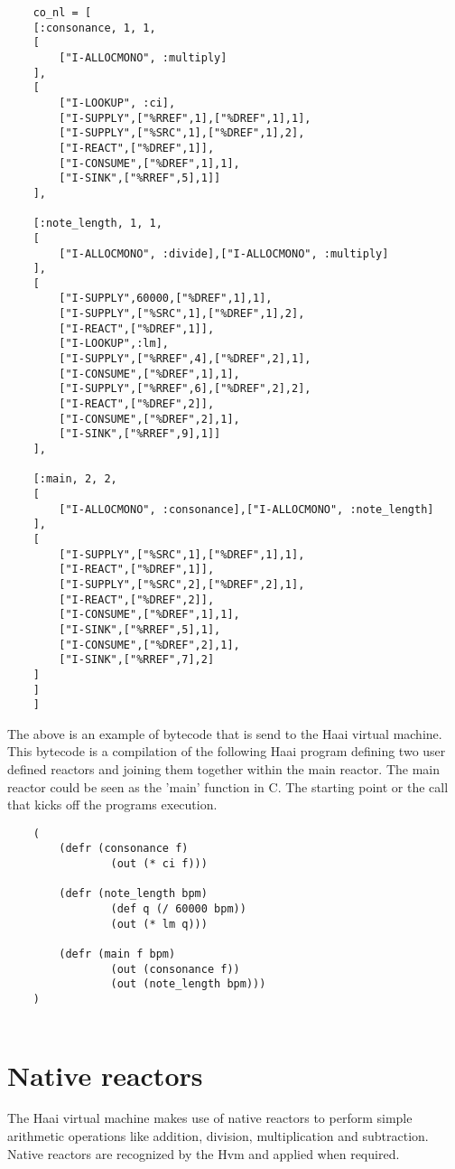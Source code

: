 \documentclass[a4paper]{book}
\begin{document}
\begin{verbatim}
	co_nl = [
	[:consonance, 1, 1,
	[
	    ["I-ALLOCMONO", :multiply]
	],
	[
	    ["I-LOOKUP", :ci],
	    ["I-SUPPLY",["%RREF",1],["%DREF",1],1],
	    ["I-SUPPLY",["%SRC",1],["%DREF",1],2],
	    ["I-REACT",["%DREF",1]],
	    ["I-CONSUME",["%DREF",1],1],
	    ["I-SINK",["%RREF",5],1]]
	],
	
	[:note_length, 1, 1,
	[
	    ["I-ALLOCMONO", :divide],["I-ALLOCMONO", :multiply]
	],
	[
	    ["I-SUPPLY",60000,["%DREF",1],1],
	    ["I-SUPPLY",["%SRC",1],["%DREF",1],2],
	    ["I-REACT",["%DREF",1]],
	    ["I-LOOKUP",:lm],
	    ["I-SUPPLY",["%RREF",4],["%DREF",2],1],
	    ["I-CONSUME",["%DREF",1],1],
	    ["I-SUPPLY",["%RREF",6],["%DREF",2],2],
	    ["I-REACT",["%DREF",2]],
	    ["I-CONSUME",["%DREF",2],1],
	    ["I-SINK",["%RREF",9],1]]
	],
	
	[:main, 2, 2,
	[
	    ["I-ALLOCMONO", :consonance],["I-ALLOCMONO", :note_length]
	],
	[
	    ["I-SUPPLY",["%SRC",1],["%DREF",1],1],
	    ["I-REACT",["%DREF",1]],
	    ["I-SUPPLY",["%SRC",2],["%DREF",2],1],
	    ["I-REACT",["%DREF",2]],
	    ["I-CONSUME",["%DREF",1],1],
	    ["I-SINK",["%RREF",5],1],
	    ["I-CONSUME",["%DREF",2],1],
	    ["I-SINK",["%RREF",7],2]
	]
	]
	]
\end{verbatim}

The above is an example of bytecode that is send to the Haai virtual machine. This bytecode is a compilation of the following Haai program defining two user defined reactors and joining them together within the main reactor. The main reactor could be seen as the 'main' function in C. The starting point or the call that kicks off the programs execution.

\begin{verbatim}
	(
		(defr (consonance f)
		     	(out (* ci f)))
	
	    (defr (note_length bpm)
	      		(def q (/ 60000 bpm))
	            (out (* lm q)))
	
	    (defr (main f bpm)
	      		(out (consonance f))
	      		(out (note_length bpm)))
	)
	
\end{verbatim}

\section{Native reactors}
The Haai virtual machine makes use of native reactors to perform simple arithmetic operations like addition, division, multiplication and subtraction. Native reactors are recognized by the Hvm and applied when required.
\end{document}
